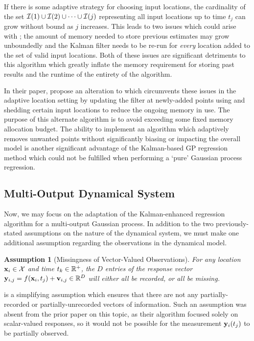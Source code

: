 \documentclass[10pt]{article}
\newtheorem{assumption}{Assumption}[section]
\numberwithin{equation}{section}
\begin{document}
If there is some adaptive strategy for choosing input locations, the cardinality of the set $\mathcal{I}(1) \cup \mathcal{I}(2) \cup \cdots \cup \mathcal{I}(j)$ representing all input locations up to time $t_{j}$ can grow without bound as $j$ increases. This leads to two issues which could arise with ; the amount of memory needed to store previous estimates may grow unboundedly and the Kalman filter needs to be re-run for \emph{every} location added to the set of valid input locations. Both of these issues are significant detriments to this algorithm which greatly inflate the memory requirement for storing past results and the runtime of the entirety of the algorithm.

In their paper, \citeauthor{Todescato-Efficient-2020} propose an alteration to  which circumvents these issues in the adaptive location setting by updating the filter at newly-added points using  and shedding certain input locations to reduce the ongoing memory in use. The purpose of this alternate algorithm is to avoid exceeding some fixed memory allocation budget. The ability to implement an algorithm which adaptively removes unwanted points without significantly biasing or impacting the overall model is another significant advantage of the Kalman-based GP regression method which could not be fulfilled when performing a `pure' Gaussian process regression.

\subsection{Multi-Output Dynamical System}
Now, we may focus on the adaptation of the Kalman-enhanced regression algorithm for a multi-output Gaussian process. In addition to the two previously-stated assumptions on the nature of the dynamical system, we must make one additional assumption regarding the observations in the dynamical model.
\begin{assumption}[Missingness of Vector-Valued Observations]
\label{ass:all-or-nothing}
    For any location $\mathbf{x}_{i} \in \mathcal{X}$ and time $t_{k} \in \mathbb{R}^{+}$, the $D$ entries of the response vector $\mathbf{y}_{i,j} = f(\mathbf{x}_{i}, t_{j}) + \mathbf{v}_{i,j} \in \mathbb{R}^{D}$ will either all be recorded, or all be missing.
\end{assumption}
 is a simplifying assumption which ensures that there are not any partially-recorded or partially-unrecorded vectors of information. Such an assumption was absent from the prior paper on this topic, as their algorithm focused solely on scalar-valued responses, so it would not be possible for the measurement $\mathbf{y}_{i}(t_{j})$ to be partially observed.
\end{document}
